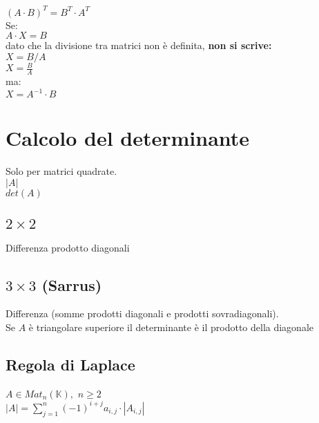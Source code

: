 \documentclass[a4paper, twoside, italian, 11pt]{book}
\newcommand{\K}{\mathbb{K}}
\begin{document}
\noindent
$(A \cdot B)^T = B^T \cdot A^T$ \\

\noindent
Se: \\

$A \cdot X = B$ \\

\noindent
dato che la divisione tra matrici non è definita, \textbf{non si scrive:} \\

$X = B / A$ \\
\indent
$X = \frac{B}{A}$ \\

\noindent
ma: \\

$X = A^{-1} \cdot B$



\section{Calcolo del determinante}

Solo per matrici quadrate. \\

\noindent
$\left | A \right |$ \\

\noindent
$det(A)$



\subsection{$2 \times 2$}

Differenza prodotto diagonali


\subsection{$3 \times 3$ (Sarrus)}

Differenza (somme prodotti diagonali e prodotti sovradiagonali). \\

\noindent
Se $A$ è triangolare superiore il determinante è il prodotto della diagonale


\subsection{Regola di Laplace}

$A \in Mat_n(\K),$ $n \geq 2$ \\

\noindent
$\left | A \right | = \sum\limits_{j=1}^{n} (-1)^{i+j} a_{i,j} \cdot \left | A_{i,j} \right |$ \\
\end{document}
